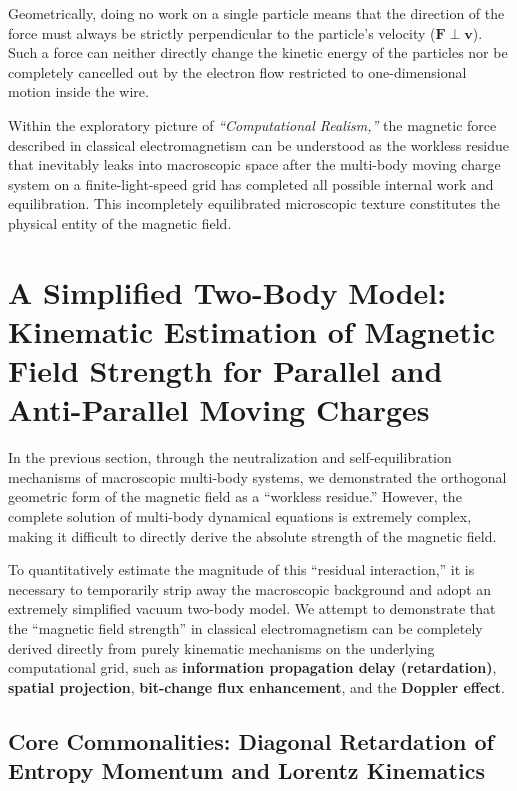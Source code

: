 \documentclass[12pt, a4paper]{article}
\begin{document}
Geometrically, doing no work on a single particle means that the direction of the force must always be strictly perpendicular to the particle's velocity ($\bm{F} \perp \bm{v}$). Such a force can neither directly change the kinetic energy of the particles nor be completely cancelled out by the electron flow restricted to one-dimensional motion inside the wire.

Within the exploratory picture of \textit{``Computational Realism,''} the magnetic force described in classical electromagnetism can be understood as the workless residue that inevitably leaks into macroscopic space after the multi-body moving charge system on a finite-light-speed grid has completed all possible internal work and equilibration. This incompletely equilibrated microscopic texture constitutes the physical entity of the magnetic field.



\section{A Simplified Two-Body Model: Kinematic Estimation of Magnetic Field Strength for Parallel and Anti-Parallel Moving Charges}

In the previous section, through the neutralization and self-equilibration mechanisms of macroscopic multi-body systems, we demonstrated the orthogonal geometric form of the magnetic field as a ``workless residue.'' However, the complete solution of multi-body dynamical equations is extremely complex, making it difficult to directly derive the absolute strength of the magnetic field.

To quantitatively estimate the magnitude of this ``residual interaction,'' it is necessary to temporarily strip away the macroscopic background and adopt an extremely simplified vacuum two-body model. We attempt to demonstrate that the ``magnetic field strength'' in classical electromagnetism can be completely derived directly from purely kinematic mechanisms on the underlying computational grid, such as \textbf{information propagation delay (retardation)}, \textbf{spatial projection}, \textbf{bit-change flux enhancement}, and the \textbf{Doppler effect}.

\subsection{Core Commonalities: Diagonal Retardation of Entropy Momentum and Lorentz Kinematics}
\end{document}
